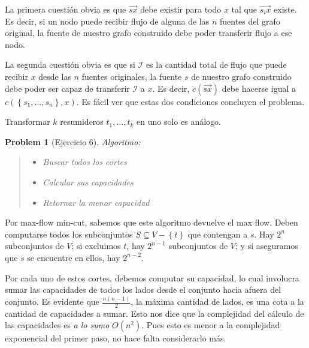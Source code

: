 \documentclass[a4paper]{article}
\newtheorem{problem}{Problem}
\newtheorem{problem}{Problem}
\begin{document}
La primera cuestión obvia es que $\overrightarrow{sx}$ debe existir para todo
$x $ tal que $\overrightarrow{s_i x}$ existe. Es decir, si un nodo puede recibir
flujo de alguna de las $n$ fuentes del grafo original, la fuente de nuestro
grafo construido debe poder transferir flujo a ese nodo.

La segunda cuestión obvia es que si $\mathscr{I}$ es la cantidad total de flujo
que puede recibir $x$ desde las $n$ fuentes originales, la fuente $s$ de nuestro
grafo construido debe poder ser capaz de transferir $\mathscr{I}$ a $x$. Es
decir, $c(\overrightarrow{sx})$ debe hacerse igual a $c(\left\{ s_1, \ldots, s_n
\right\}, x )$. Es fácil ver que estas dos condiciones concluyen el problema. 

Transformar $k$ resumideros $t_1, \ldots, t_k$ en uno solo es análogo.

\begin{problem}[Ejercicio 6]
   Algoritmo: 

   
   \small
   \begin{quote}
   
   \begin{itemize}
       \item Buscar todos los cortes 
        \item Calcular sus capacidades 
        \item Retornar la menor capacidad
   \end{itemize}
   
   \end{quote}
   \normalsize
   

\end{problem}

Por max-flow min-cut, sabemos que este algoritmo devuelve el max flow. Deben
computarse todos los subconjuntos $S \subseteq V - \left\{ t \right\} $ que
contengan a $s$. Hay $2^{n}$ subconjuntos de $V$; si excluimos $t$, hay $2^{n -
1}$ subconjuntos de $V$; y si aseguramos que $s$ se encuentre en ellos, hay
$2^{n - 2}$.

Por cada uno de estos cortes, debemos computar su capacidad, lo cual involucra
sumar las capacidades de todos los lados desde el conjunto hacia afuera del
conjunto. Es evidente que $\frac{n(n-1)}{2}$, la máxima cantidad de lados, es
una cota a la cantidad de capacidades a sumar. Esto nos dice que la complejidad
del cálculo de las capacidades es \textit{a lo sumo} $O(n^2)$. Pues esto es
menor a la complejidad exponencial del primer paso, no hace falta considerarlo
más. 
\end{document}

